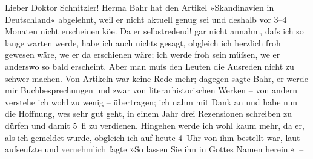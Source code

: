 \pstart{}Lieber Doktor Schnitzler!\pend\vspace{0.5em}
\pstart
           Herma{\geminationn} Bahr hat
               den Artikel »Skandinavien in Deutschland«
               abgelehnt, weil er nicht aktuell genug sei und deshalb vor 3–4 Monaten nicht
               erscheinen kö{\geminationn}e. Da er selbstredend! gar nicht annahm,
               daſs ich so lange warten werde, habe ich auch nichts gesagt, obgleich ich herzlich
               froh gewesen wäre, we{\geminationn} er da{\geminationn} erschienen wäre; ich werde froh sein müſsen, we{\geminationn} er
               anderswo so bald erscheint. Aber man muſs den Leuten \introOben{}die\introOben{}
               Ausreden nicht zu schwer machen. Von Artikeln war keine Rede mehr; dagegen sagte Bahr, er werde mir Buchbesprechungen und zwar
               von literarhistorischen Werken – von andern verstehe ich wohl zu wenig – übertragen;
               ich nahm mit Dank an und habe nun die Hoffnung, we{\geminationn}s
               sehr gut geht, in einem Jahr drei Rezensionen schreiben zu dürfen und damit {\pb}5 fl zu verdienen. Hingehen werde ich wohl kaum mehr,
               da er, als ich gemeldet wurde, obgleich ich auf heute 4 Uhr von ihm bestellt war,
               laut aufseufzte und \textcolor{gray}{vernehmlich}{ }ſagte »So lassen Sie ihn in Gottes Namen
               herein.« –\pend
           
